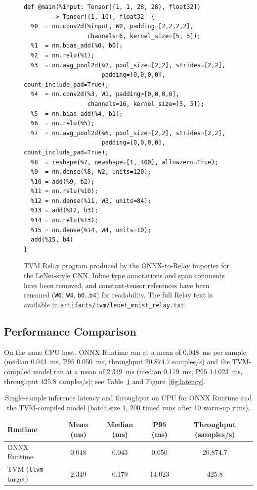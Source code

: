 \documentclass[fleqn,10pt]{olplainarticle}
\begin{document}
\begin{figure}[H]
\begin{verbatim}
def @main(%input: Tensor[(1, 1, 28, 28), float32])
        -> Tensor[(1, 10), float32] {
  %0  = nn.conv2d(%input, W0, padding=[2,2,2,2],
                  channels=6, kernel_size=[5, 5]);
  %1  = nn.bias_add(%0, b0);
  %2  = nn.relu(%1);
  %3  = nn.avg_pool2d(%2, pool_size=[2,2], strides=[2,2],
                      padding=[0,0,0,0], count_include_pad=True);
  %4  = nn.conv2d(%3, W1, padding=[0,0,0,0],
                  channels=16, kernel_size=[5, 5]);
  %5  = nn.bias_add(%4, b1);
  %6  = nn.relu(%5);
  %7  = nn.avg_pool2d(%6, pool_size=[2,2], strides=[2,2],
                      padding=[0,0,0,0], count_include_pad=True);
  %8  = reshape(%7, newshape=[1, 400], allowzero=True);
  %9  = nn.dense(%8, W2, units=120);
  %10 = add(%9, b2);
  %11 = nn.relu(%10);
  %12 = nn.dense(%11, W3, units=84);
  %13 = add(%12, b3);
  %14 = nn.relu(%13);
  %15 = nn.dense(%14, W4, units=10);
  add(%15, b4)
}
\end{verbatim}
\caption{TVM Relay program produced by the ONNX-to-Relay importer for the LeNet-style CNN. Inline type annotations and span comments have been removed, and constant-tensor references have been renamed (\texttt{W0}\dots\texttt{W4}, \texttt{b0}\dots\texttt{b4}) for readability. The full Relay text is available in \texttt{artifacts/tvm/lenet\_mnist\_relay.txt}.}
\label{fig:relay}
\end{figure}

\subsection{Performance Comparison}

On the same CPU host, ONNX Runtime ran at a mean of 0.048~ms per sample (median 0.043~ms, P95 0.050~ms, throughput 20{,}874.7 samples/s) and the TVM-compiled model ran at a mean of 2.349~ms (median 0.179~ms, P95 14.023~ms, throughput 425.8 samples/s); see Table~\ref{tab:performance} and Figure~\ref{fig:latency}.

\begin{table}[H]
\centering
\caption{Single-sample inference latency and throughput on CPU for ONNX Runtime and the TVM-compiled model (batch size 1, 200 timed runs after 10 warm-up runs).}
\label{tab:performance}
\begin{tabular}{lcccc}
\hline
Runtime & Mean (ms) & Median (ms) & P95 (ms) & Throughput (samples/s) \\
\hline
ONNX Runtime & 0.048 & 0.043 & 0.050 & 20{,}874.7 \\
TVM (\texttt{llvm} target) & 2.349 & 0.179 & 14.023 & 425.8 \\
\hline
\end{tabular}
\end{table}
\end{document}
